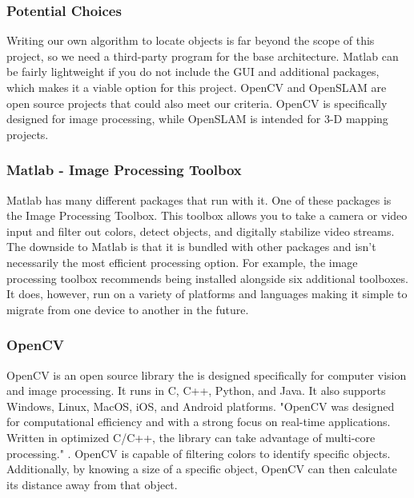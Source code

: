 \documentclass[onecolumn, draftclsnofoot,10pt, compsoc]{IEEEtran}
\begin{document}
\subsubsection{Potential Choices}

Writing our own algorithm to locate objects is far beyond the scope 
of this project, so we need a third-party program for the base 
architecture. Matlab can be fairly lightweight if you do not 
include the GUI and additional packages, which makes it a viable 
option for this project. OpenCV and OpenSLAM are open source 
projects that could also meet our criteria. OpenCV is specifically 
designed for image processing, while OpenSLAM is intended for 3-D 
mapping projects. 

\subsubsection{Matlab - Image Processing Toolbox}

Matlab has many different packages that run with it. One of these 
packages is the Image Processing Toolbox\cite{r30}. This toolbox allows you to take a camera or video input and filter out colors, detect 
objects, and digitally stabilize video streams. The downside to 
Matlab is that it is bundled with other packages and isn't 
necessarily the most efficient processing option. For example, the 
image processing toolbox recommends being installed alongside six 
additional toolboxes. It does, however, run on a variety of 
platforms and languages making it simple to migrate from one device 
to another in the future. 


\subsubsection{OpenCV}

OpenCV\cite{r8} is an open source library the is designed specifically for 
computer vision and image processing. It runs in C, C++, Python, 
and Java. It also supports Windows, Linux, MacOS, iOS, and Android 
platforms. "OpenCV was designed for computational efficiency and 
with a strong focus on real-time applications. Written in optimized 
C/C++, the library can take advantage of multi-core processing." .
OpenCV is capable of filtering colors to identify specific objects. 
Additionally, by knowing a size of a specific object, OpenCV can 
then calculate its distance away from that object. 
\end{document}
